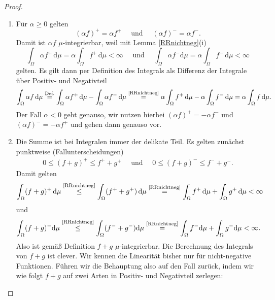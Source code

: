 \begin{proof}\abs 
	\begin{enumerate}[label=(\roman*)]
		\item 
			 F\"ur $\alpha \geq 0$ gelten $$(\alpha f)^+ = \alpha f^+\quad \text{ und }\quad 
				(\alpha f)^- = \alpha f^-.$$
			Damit ist $\alpha f$ $\mu$-integrierbar, weil mit Lemma \ref{RRnichtneg}(i)
			\[ \int_{\Omega} \alpha f^+\, \mathrm{d}\mu = \alpha \int_{\Omega} f^+ \,\mathrm{d}\mu < \infty\quad \text{ und }\quad \int_{\Omega} \alpha f^- \mathrm{d}\mu = \alpha \int_{\Omega} f^-\, \mathrm{d}\mu < \infty\]
			gelten. Es gilt dann per Definition des Integrals als Differenz der Integrale \"uber Positiv- und Negativteil
			\begin{gather*}
				\int_{\Omega} \alpha f \,\mathrm{d}\mu \overset{\text{Def.}}{=} \int_{\Omega} \alpha f^+ \,\mathrm{d}\mu - \int_{\Omega} \alpha f^-\, \mathrm{d}\mu
				\overset{\text{\ref{RRnichtneg}}}{=} \alpha \int_{\Omega} f^+\, \mathrm{d}\mu -\alpha \int_{\Omega} f^-\, \mathrm{d}\mu =\alpha \int_{\Omega} f \,\mathrm{d}\mu.\\
			\end{gather*}
			Der Fall $\alpha <0$ geht genauso, wir nutzen hierbei $(\alpha f)^+ = -\alpha f^-$ und $(\alpha f)^- = -\alpha f^+$ und gehen dann genauso vor.
		\item Die Summe ist bei Integralen immer der delikate Teil. Es gelten zun\"achst punktweise (Fallunterscheidungen)
		\begin{align*}
			0\leq(f+g)^+ \leq f^+ + g^+\quad \text{ und }\quad 0\leq (f+g)^- \leq f^- + g^-.
		\end{align*}	
		 Damit gelten 
		\begin{align*}
		\int_{\Omega} (f + g)^+ \,\mathrm{d}\mu \overset{\text{\ref{RRnichtneg}}}{\leq} \int_{\Omega} (f^+ + g^+)\,\mathrm{d}\mu \overset{\text{\ref{RRnichtneg}}}{=} \int_{\Omega} f^+\, \mathrm{d}\mu + \int_{\Omega} g^+ \,\mathrm{d}\mu < \infty
		\end{align*}
		und
		\begin{align*}
		\int_{\Omega} (f + g)^- \mathrm{d}\mu \overset{\text{\ref{RRnichtneg}}}{\leq} \int_{\Omega} (f^- + g^-) \mathrm{d}\mu \overset{\text{\ref{RRnichtneg}}}{=} \int_{\Omega} f^- \mathrm{d}\mu + \int_{\Omega} g^- \mathrm{d}\mu < \infty.
		\end{align*}
		Also ist gem\"a\ss{} Definition $f + g$ $\mu$-integrierbar. Die Berechnung des Integrals von $f+g$ ist clever. Wir kennen die Linearit\"at bisher nur f\"ur nicht-negative Funktionen. F\"uhren wir die Behauptung also auf den Fall zur\"uck, indem wir wie folgt $f+g$ auf zwei Arten in Positiv- und Negativteil zerlegen:

\end{enumerate}
\end{proof}
